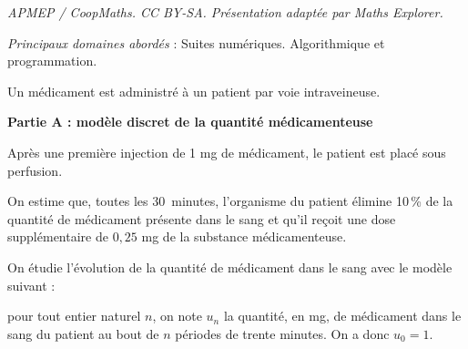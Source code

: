 \documentclass[10pt]{article}
\begin{document}
\noindent\textit{APMEP / CoopMaths. CC BY-SA. Présentation adaptée par Maths Explorer.}\par\medskip
\medskip

\emph{Principaux domaines abordés} : Suites numériques. Algorithmique et programmation.

\medskip

Un médicament est administré à un patient par voie intraveineuse. 

\bigskip

\textbf{Partie A : modèle discret de la quantité médicamenteuse}

\medskip

Après une première injection de 1 mg de médicament, le patient est placé sous perfusion.

On estime que, toutes les $30$~minutes, l'organisme du patient élimine 10\,\% de la quantité de médicament présente dans le sang et qu'il reçoit une dose supplémentaire de $0,25$ mg de la substance médicamenteuse.

On étudie l'évolution de la quantité de médicament dans le sang avec le modèle suivant :

pour tout entier naturel $n$, on note $u_n$ la quantité, en mg, de médicament dans le sang du patient au bout de $n$ périodes de trente minutes. On a donc $u_0 = 1$.

\medskip
\end{document}
